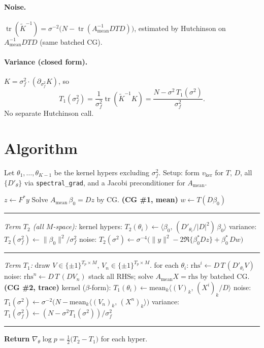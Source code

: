 \documentclass[11pt]{article}
\newcommand{\tr}{\operatorname{tr}}
\newcommand{\Ktil}{\widetilde K}
\newcommand{\Amean}{A_{\text{mean}}}
\begin{document}
\paragraph{Noise.} $\tr(\Ktil^{-1}) = \sigma^{-2}\bigl(N - \tr(\Amean^{-1}DTD)\bigr)$, estimated by Hutchinson on $\Amean^{-1}DTD$ (same batched CG).

\paragraph{Variance (closed form).} $K = \sigma_f^2\cdot(\partial_{\sigma_f^2}K)$, so
\begin{equation}
  T_1(\sigma_f^2) = \frac{1}{\sigma_f^2}\tr(\Ktil^{-1}K) = \frac{N - \sigma^2\,T_1(\sigma^2)}{\sigma_f^2}.
\end{equation}
No separate Hutchinson call.

\section{Algorithm}

Let $\theta_1,\dots,\theta_{K-1}$ be the kernel hypers excluding $\sigma_f^2$. Setup: form $v_{\text{ker}}$ for $T$, $D$, all $\{D'_\theta\}$ via \texttt{spectral\_grad}, and a Jacobi preconditioner for $\Amean$.

\begin{algorithm}[h]
\caption{EFGP log-marginal gradient: one NUFFT, two CG calls.}
\begin{algorithmic}[1]
\State $z \leftarrow F^*y$ 
\State Solve $\Amean\,\beta_0 = D z$ by CG. \hfill\textbf{(CG \#1, mean)}
\State $w \leftarrow T(D\beta_0)$ 
\Statex\rule{\textwidth}{0.4pt}
\State \emph{Term $T_2$ (all $M$-space):}
\State \quad kernel hypers: $T_2(\theta_i) \leftarrow \langle\beta_0,\,(D'_{\theta_i}/|D|^2)\,\beta_0\rangle$
\State \quad variance: $T_2(\sigma_f^2) \leftarrow \|\beta_0\|^2/\sigma_f^2$
\State \quad noise: $T_2(\sigma^2) \leftarrow \sigma^{-4}\bigl(\|y\|^2 - 2\Re\{\beta_0^* D z\} + \beta_0^*\, D w\bigr)$
\Statex\rule{\textwidth}{0.4pt}
\State \emph{Term $T_1$:} draw $V\in\{\pm1\}^{T_p\times M}$, $V_n\in\{\pm1\}^{T_p\times M}$.
\State \quad for each $\theta_i$: $\mathrm{rhs}^i \leftarrow D\,T\,(D'_{\theta_i} V)$
\State \quad noise: $\mathrm{rhs}^n \leftarrow D\,T\,(D V_n)$
\State \quad stack all RHSs; solve $\Amean X = \mathrm{rhs}$ by batched CG. \hfill\textbf{(CG \#2, trace)}
\State \quad kernel ($\beta$-form): $T_1(\theta_i) \leftarrow \mathrm{mean}_k\bigl\langle (V)_k,\,(X^i)_k/D\bigr\rangle$
\State \quad noise: $T_1(\sigma^2) \leftarrow \sigma^{-2}\bigl(N - \mathrm{mean}_k\langle (V_n)_k,\,(X^n)_k\rangle\bigr)$
\State \quad variance: $T_1(\sigma_f^2) \leftarrow (N - \sigma^2 T_1(\sigma^2))/\sigma_f^2$
\Statex\rule{\textwidth}{0.4pt}
\State \textbf{Return} $\nabla_\theta\log p = \tfrac12\bigl(T_2 - T_1\bigr)$ for each hyper.
\end{algorithmic}
\end{algorithm}
\end{document}
